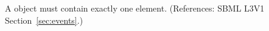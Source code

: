 A \Delay object must contain exactly one  element. (References:
SBML L3V1 Section~\ref{sec:events}.)
